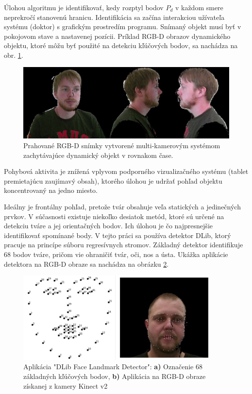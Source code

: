 Úlohou algoritmu je identifikovať, kedy rozptyl bodov $P_d$ v každom smere neprekročí stanovenú hranicu. Identifikácia sa začína interakciou užívateľa systému (doktor) s grafickým prostredím programu. Snímaný objekt musí byť v pokojovom stave a nastavenej pozícii. Príklad RGB-D obrazov dynamického objektu, ktoré môžu byť použité na detekciu kľúčových bodov, sa nachádza na obr. \ref{fig:dlib:views}. 

\begin{figure}[H]
	\centering
	\includegraphics[width=\textwidth]{figures/rgbd_views.png}
	\caption{Prahované RGB-D snímky vytvorené multi-kamerovým systémom zachytávajúce dynamický objekt v rovnakom čase.}
	\label{fig:dlib:views}
\end{figure}

Pohybová aktivita je znížená vplyvom podporného vizualizačného systému (tablet premietajúcu zaujímavý obsah), ktorého úlohou je udržať pohľad objektu koncentrovaný na jedno miesto.

Ideálny je frontálny pohľad, pretože tvár obsahuje veľa statických a jedinečných prvkov. V súčasnosti existuje niekoľko desiatok metód, ktoré sú určené na detekciu tváre a jej orientačných bodov. Ich úlohou je čo najpresnejšie identifikovať spomínané body. V tejto práci sa používa detektor DLib, ktorý pracuje na princípe súboru regresívnych stromov.
Základný detektor identifikuje 68 bodov tváre, pričom vie ohraničiť tvár, oči, nos a ústa. Ukážka aplikácie detektora na RGB-D obraze sa nachádza na obrázku \ref{fig:dlib:points}.

\begin{figure}[H]
	\centering
	\includegraphics[width=0.9\textwidth]{figures/face_landmarks.png}
	\caption{Aplikácia "DLib Face Landmark Detector":  \textbf{ a)} Označenie 68 základných kľúčových bodov,  \textbf{ b)} Aplikácia na RGB-D obraze získanej z kamery Kinect v2}
	\label{fig:dlib:points}
\end{figure}
 
